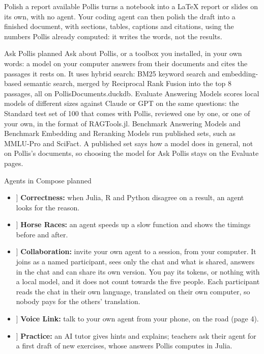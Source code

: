 \documentclass[10pt,a4paper]{article}
\newcommand{\listicon}[1]{\makebox[1.25em][c]{\color{deepamber}#1}}
\newcommand{\status}[1]{\hfill{\footnotesize\color{soft}#1}}
\begin{document}
\vspace{2mm}
\begin{pbox}{Polish a report \status{available}}
Pollis turns a notebook into a LaTeX report or slides on its own, with no agent. Your coding agent can then
polish the draft into a finished document, with sections, tables, captions and citations, using the numbers
Pollis already computed: it writes the words, not the results.
\end{pbox}

\vspace{2mm}
\begin{pbox}{Ask Pollis \status{planned}}
Ask about Pollis, or a toolbox you installed, in your own words: a model on your computer answers from their
documents and cites the passages it rests on. It uses
hybrid search: BM25 keyword search and embedding-based semantic search, merged by Reciprocal Rank Fusion into the top 8 passages, all on PollisDocuments.duckdb. Evaluate Answering Models scores local models of different sizes against Claude
or GPT on the same questions: the Standard test set of 100 that comes with Pollis, reviewed one by one, or one of
your own, in the format of RAGTools.jl. Benchmark Answering Models and Benchmark Embedding and Reranking Models run
published sets, such as MMLU-Pro and SciFact. A published set says how a model does in general, not on Pollis's documents,
so choosing the model for Ask Pollis stays on the Evaluate pages.
\end{pbox}

\vspace{2mm}
\begin{pbox}{Agents in Compose \status{planned}}
\begin{itemize}[leftmargin=1.7em]
  \item[\listicon{\faBalanceScale}] \textbf{Correctness:} when Julia, R and Python disagree on a result, an agent looks for the reason.
  \item[\listicon{\faStopwatch}] \textbf{Horse Races:} an agent speeds up a slow function and shows the timings before and after.
  \item[\listicon{\faUserFriends}] \textbf{Collaboration:} invite your own agent to a session, from your computer. It joins as a named participant, sees only the chat and what is shared, answers in the chat and can share its own version. You pay its tokens, or nothing with a local model, and it does not count towards the five people. Each participant reads the chat in their own language, translated on their own computer, so nobody pays for the others' translation.
  \item[\listicon{\faMicrophone}] \textbf{Voice Link:} talk to your own agent from your phone, on the road (page 4).
  \item[\listicon{\faGraduationCap}] \textbf{Practice:} an AI tutor gives hints and explains; teachers ask their agent for a first draft of new exercises, whose answers Pollis computes in Julia.
\end{itemize}
\end{pbox}
\end{document}
